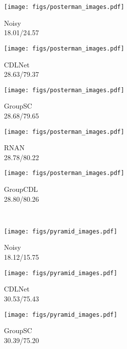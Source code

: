 \documentclass[lettersize,journal]{IEEEtran}
\begin{document}
\begin{figure*}[thb]
    \centering
    \captionsetup[subfigure]{justification=centering}
    \begin{subfigure}{0.19\textwidth}
    \centering
    \texttt{[image: figs/posterman\_images.pdf]}
    \caption{Noisy \\ 18.01/24.57}
\end{subfigure}\begin{subfigure}{0.19\textwidth}
    \centering
    \texttt{[image: figs/posterman\_images.pdf]}
    \caption{CDLNet \cite{janjusevicCDLNet2022} \\ 28.63/79.37}
\end{subfigure}\begin{subfigure}{0.19\textwidth}
    \centering
    \texttt{[image: figs/posterman\_images.pdf]}
    \caption{GroupSC \cite{lecouat2020nonlocal} \\ 28.68/79.65}
\end{subfigure}\begin{subfigure}{0.19\textwidth}
    \centering
    \texttt{[image: figs/posterman\_images.pdf]}
    \caption{RNAN \cite{zhang2019residual} \\ 28.78/80.22}
\end{subfigure}\begin{subfigure}{0.19\textwidth}
    \centering
    \texttt{[image: figs/posterman\_images.pdf]}
    \caption{GroupCDL \\ 28.80/80.26}
\end{subfigure}     \\
    \begin{subfigure}{0.19\textwidth}
    \centering
    \texttt{[image: figs/pyramid\_images.pdf]}
    \caption{Noisy \\ 18.12/15.75}
\end{subfigure}\begin{subfigure}{0.19\textwidth}
    \centering
    \texttt{[image: figs/pyramid\_images.pdf]}
    \caption{CDLNet \cite{janjusevicCDLNet2022} \\ 30.53/75.43}
\end{subfigure}\begin{subfigure}{0.19\textwidth}
    \centering
    \texttt{[image: figs/pyramid\_images.pdf]}
    \caption{GroupSC \cite{lecouat2020nonlocal} \\ 30.39/75.20}

\end{subfigure}
\end{figure*}
\end{document}
